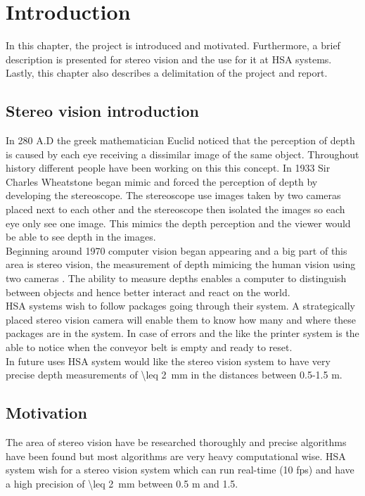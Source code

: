 \chapter{Introduction}\label{ch:introduction}
In this chapter, the project is introduced and motivated. Furthermore, a brief description is presented for stereo vision and the use for it at HSA systems. Lastly, this chapter also describes a delimitation of the project and report.\\

\section{Stereo vision introduction}\label{sec:stereo vision}
In 280 A.D the greek mathematician Euclid noticed that the perception of depth is caused by each eye receiving a dissimilar image of the same object. Throughout history different people have been working on this this concept. In 1933 Sir Charles Wheatstone began mimic and forced the perception of depth by developing the stereoscope. The stereoscope use images taken by two cameras placed next to each other and the stereoscope then isolated the images so each eye only see one image. This mimics the depth perception and the viewer would be able to see depth in the images. \cite{lit:historyofstereophoto}\\

Beginning around 1970 computer vision began appearing and a big part of this area is stereo vision, the measurement of depth mimicing the human vision using two cameras \cite{Szeliski2010}. The ability to measure depths enables a computer to distinguish between objects and hence better interact and react on the world.\\

HSA systems wish to follow packages going through their system. A strategically placed stereo vision camera will enable them to know how many and where these packages are in the system. In case of errors and the like the printer system is the able to notice when the conveyor belt is empty and ready to reset.\\
In future uses HSA system would like the stereo vision system to have very precise depth measurements of \SI{\leq 2}{\milli\meter} in the distances between 0.5-1.5 m.

\section{Motivation}\label{sec:intromotiv}
The area of stereo vision have be researched thoroughly and precise algorithms have been found but most algorithms are very heavy computational wise. HSA system wish for a stereo vision system which can run real-time (10 fps) and have a high precision of \SI{\leq 2}{\milli\meter} between 0.5 m and 1.5.

